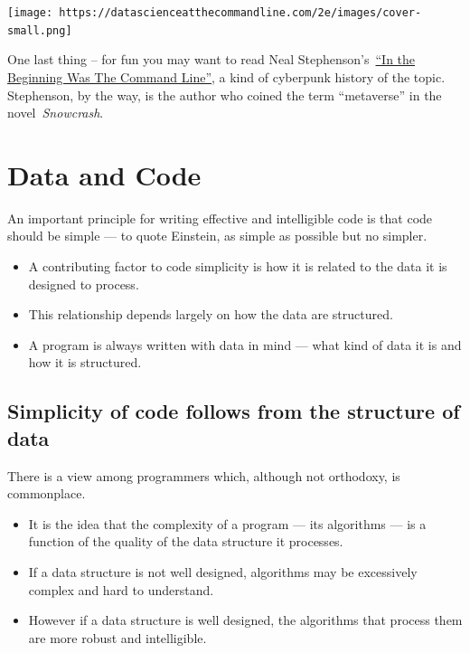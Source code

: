\documentclass[
  letterpaper,
  DIV=11,
  numbers=noendperiod]{scrreport}
\providecommand{\tightlist}{%
  \setlength{\itemsep}{0pt}\setlength{\parskip}{0pt}}\usepackage{longtable,booktabs,array}
\begin{document}
\texttt{[image: https://datascienceatthecommandline.com/2e/images/cover-small.png]}

One last thing -- for fun you may want to read Neal
Stephenson's~\href{http://project.cyberpunk.ru/lib/in_the_beginning_was_the_command_line/}{``In
the Beginning Was The Command Line''}, a kind of cyberpunk history of
the topic. Stephenson, by the way, is the author who coined the term
``metaverse'' in the novel~\emph{Snowcrash}.

\hypertarget{data-and-code}{%
\chapter{Data and Code}\label{data-and-code}}

An important principle for writing effective and intelligible code is
that code should be simple --- to quote Einstein, as simple as possible
but no simpler.

\begin{itemize}
\tightlist
\item
  A contributing factor to code simplicity is how it is related to the
  data it is designed to process.
\item
  This relationship depends largely on how the data are structured.
\item
  A program is always written with data in mind --- what kind of data it
  is and how it is structured.
\end{itemize}

\hypertarget{simplicity-of-code-follows-from-the-structure-of-data}{%
\section{Simplicity of code follows from the structure of
data}\label{simplicity-of-code-follows-from-the-structure-of-data}}

There is a view among programmers which, although not orthodoxy, is
commonplace.

\begin{itemize}
\tightlist
\item
  It is the idea that the complexity of a program --- its algorithms ---
  is a function of the quality of the data structure it processes.
\item
  If a data structure is not well designed, algorithms may be
  excessively complex and hard to understand.
\item
  However if a data structure is well designed, the algorithms that
  process them are more robust and intelligible.
\end{itemize}
\end{document}
